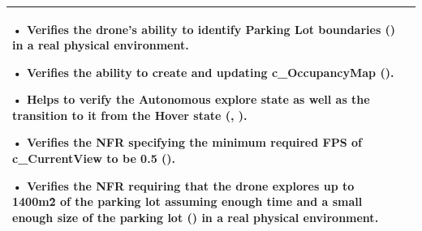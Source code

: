 \documentclass[12pt, titlepage]{article}
\begin{document}
\begin{table}[!h]
\begin{center}
\begin{tabular}{ | m{1.5cm} | m{15cm} | }
• Verifies the drone’s ability to identify Parking Lot boundaries (\nameref{GEN_001}) in a real physical environment.

• Verifies the ability to create and updating c_OccupancyMap (\nameref{GEN_002}).

• Helps to verify the Autonomous explore state as well as the transition to it from the Hover state (\nameref{STA_003}, \nameref{TRANS_004}).

• Verifies the NFR specifying the minimum required FPS of c\_CurrentView to be 0.5 (\nameref{PERF_004}).

• Verifies the NFR requiring that the drone explores up to 1400m\^2 of the parking lot assuming enough time and a small enough size of the parking lot (\nameref{PERF_001}) in a real physical environment.
\\ 
\hline
\end{tabular}
\end{center}
\end{table}
\end{document}

